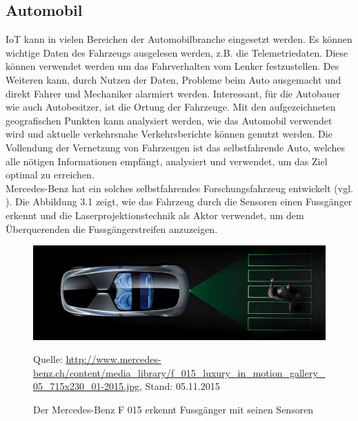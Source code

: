 \subsection{Automobil}
\gls{IoT} kann in vielen Bereichen der Automobilbranche eingesetzt werden. Es können wichtige Daten des Fahrzeugs ausgelesen werden, z.B. die Telemetriedaten. Diese können verwendet werden um das Fahrverhalten vom Lenker festzustellen. Des Weiteren kann, durch Nutzen der Daten, Probleme beim Auto ausgemacht und direkt Fahrer und Mechaniker alarmiert werden.
Interessant, für die Autobauer wie auch Autobesitzer, ist die Ortung der Fahrzeuge. Mit den aufgezeichneten geografischen Punkten kann analysiert werden, wie das Automobil verwendet wird und aktuelle verkehrsnahe Verkehrsberichte können genutzt werden. Die Vollendung der Vernetzung von Fahrzeugen ist das selbstfahrende Auto, welches alle nötigen Informationen empfängt, analysiert und verwendet, um das Ziel optimal zu erreichen.\\
Mercedes-Benz hat ein solches selbstfahrendes Forschungsfahrzeug entwickelt (vgl. \cite{mcbz:f015}). Die Abbildung 3.1 zeigt, wie das Fahrzeug durch die Sensoren einen Fussgänger erkennt und die Laserprojektionstechnik als Aktor verwendet, um dem Überquerenden die Fussgängerstreifen anzuzeigen.
\begin{figure}[h]
  \centering
  \includegraphics[scale=0.66]{98_Bilder/03_Marktsegmente/mercedesbenzf2}
  \caption[Fussgängererkennung des Mercedes-Benz F 015]{Der Mercedes-Benz F 015 erkennt Fussgänger mit seinen Sensoren}
  \footnotesize Quelle: \url{http://www.mercedes-benz.ch/content/media_library/f_015_luxury_in_motion_gallery_05_715x230_01-2015.jpg}, Stand: 05.11.2015
\end{figure}
\newpage

